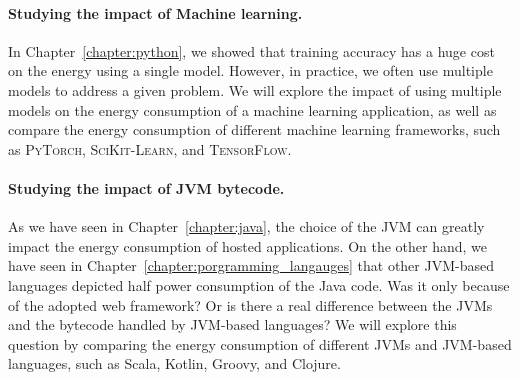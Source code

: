 \paragraph{Studying the impact of Machine learning.}
In Chapter~\ref{chapter:python}, we showed that training accuracy has a huge cost on the energy using a single model.
However, in practice, we often use multiple models to address a given problem.
We will explore the impact of using multiple models on the energy consumption of a machine learning application, as well as compare the energy consumption of different machine learning frameworks, such as \textsc{PyTorch}, \textsc{SciKit-Learn}, and \textsc{TensorFlow}.



\paragraph{Studying the impact of JVM bytecode.}
As we have seen in Chapter~\ref{chapter:java}, the choice of the JVM can greatly impact the energy consumption of hosted applications.
On the other hand, we have seen in Chapter~\ref{chapter:porgramming_langauges} that other JVM-based languages depicted half power consumption of the Java code.
Was it only because of the adopted web framework?
Or is there a real difference between the JVMs and the bytecode handled by JVM-based languages?
We will explore this question by comparing the energy consumption of different JVMs and JVM-based languages, such as Scala, Kotlin, Groovy, and Clojure.

